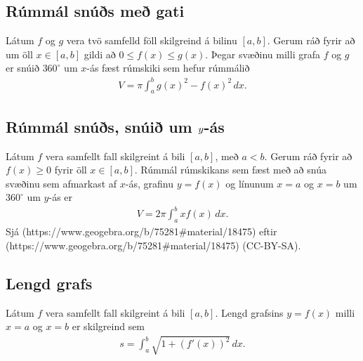 \documentclass[a4paper,10pt,icelandic]{sphinxmanual}
\begin{document}

\subsection{Rúmmál snúðs með gati}
\label{\detokenize{kafli07:rummal-snus-me-gati}}\label{\detokenize{kafli07:index-4}}
Látum \(f\) og \(g\) vera tvö samfelld föll skilgreind á bilinu
\([a, b]\). Gerum ráð fyrir að um öll \(x\in [a, b]\) gildi að
\(0\leq f(x)\leq
g(x)\). Þegar svæðinu milli grafa \(f\) og \(g\) er snúið
\(360^\circ\) um \(x\)-ás fæst rúmskiki sem hefur rúmmálið
\begin{equation*}
\begin{split}V=\pi\int_a^b g(x)^2-f(x)^2\,dx.\end{split}
\end{equation*}

\subsection{Rúmmál snúðs, snúið um \protect\(y\protect\)-ás}
\label{\detokenize{kafli07:index-5}}\label{\detokenize{kafli07:id1}}
Látum \(f\) vera samfellt fall skilgreint á bili \([a, b]\), með
\(a<b\). Gerum ráð fyrir að \(f(x)\geq 0\) fyrir öll
\(x\in [a, b]\). Rúmmál rúmskikans sem fæst með að snúa svæðinu sem
afmarkast af \(x\)-ás, grafinu \(y=f(x)\) og línunum \(x=a\)
og \(x=b\) um \(360^\circ\) um \(y\)-ás er
\begin{equation*}
\begin{split}V=2\pi\int_a^b xf(x)\,dx.\end{split}
\end{equation*}
Sjá  (https://www.geogebra.org/b/75281\#material/18475)
eftir  (https://www.geogebra.org/b/75281\#material/18475) (CC-BY-SA).


\subsection{Lengd grafs}
\label{\detokenize{kafli07:lengd-grafs}}
Látum \(f\) vera samfellt fall skilgreint á bili \([a, b]\).
Lengd grafsins \(y=f(x)\) milli \(x=a\) og \(x=b\) er
skilgreind sem
\begin{equation*}
\begin{split}s=\int_a^b\sqrt{1+(f'(x))^2}\,dx.\end{split}
\end{equation*}
\end{document}
